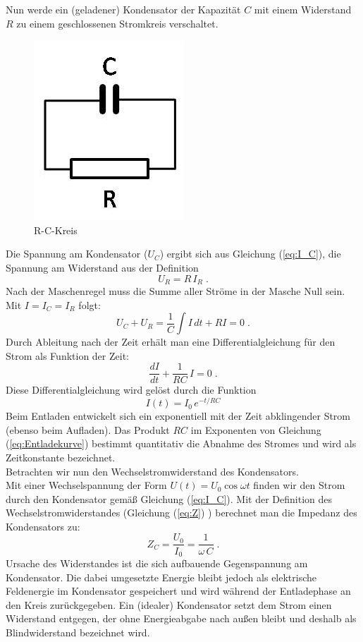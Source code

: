 Nun werde ein (geladener) Kondensator der Kapazität $C$ mit einem Widerstand $R$ zu einem geschlossenen Stromkreis verschaltet.
\begin{figure}[h]
	\centering
		\includegraphics[width=.1\textwidth]{Abbildungen/RC-Kreis.jpg}
	\caption{R-C-Kreis}
	\label{fig:RC-Kreis}
\end{figure}
Die Spannung am Kondensator ($U_C$) ergibt sich aus Gleichung (\ref{eq:I_C}), die Spannung am Widerstand aus der Definition
\begin{equation}
 U_R = R\, I_R\; .
\end{equation}
Nach der Maschenregel muss die Summe aller Ströme in der Masche Null sein. Mit $I = I_C = I_R$ folgt:
\begin{equation}
 U_C + U_R = \frac{1}{C}\int{I\, dt} + R I = 0\; .
\end{equation}
Durch Ableitung nach der Zeit erhält man eine Differentialgleichung für den Strom als Funktion der Zeit:
\begin{equation}
 \frac{dI}{dt} + \frac{1}{RC}\,I = 0\; .
\end{equation}
Diese Differentialgleichung wird gelöst durch die Funktion
\begin{equation}
 I(t) = I_0\, e^{-t/RC}
 \label{eq:Entladekurve}
\end{equation}
Beim Entladen entwickelt sich ein exponentiell mit der Zeit abklingender Strom (ebenso beim Aufladen). Das Produkt $RC$ im Exponenten von Gleichung (\ref{eq:Entladekurve}) bestimmt quantitativ die Abnahme des Stromes und wird als Zeitkonstante bezeichnet.\\

Betrachten wir nun den Wechselstromwiderstand des Kondensators.\\
Mit einer Wechselspannung der Form $U(t) =  U_0\cos\omega t$ finden wir den Strom durch den Kondensator gemäß Gleichung (\ref{eq:I_C}). Mit der Definition des Wechselstromwiderstandes (Gleichung (\ref{eq:Z}) ) berechnet man die Impedanz des Kondensators zu:
\begin{equation}
 Z_C = \frac{U_0}{I_0} = \frac{1}{\omega\, C}\; .
\end{equation}
Ursache des Widerstandes ist die sich aufbauende Gegenspannung am Kondensator. Die dabei umgesetzte Energie bleibt jedoch als elektrische Feldenergie im Kondensator gespeichert und wird während der Entladephase an den Kreis zurückgegeben. Ein (idealer) Kondensator setzt dem Strom einen Widerstand entgegen, der ohne Energieabgabe nach außen bleibt und deshalb als Blindwiderstand bezeichnet wird.\\


